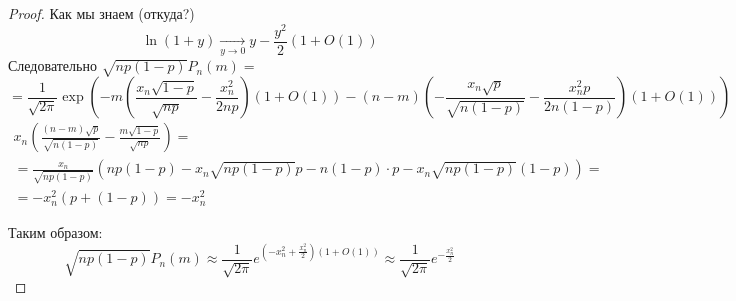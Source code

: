 \documentclass[12pt]{article}
\theoremstyle{definition} %
\theoremstyle{plain} %
\theoremstyle{remark} %
\begin{document}
\begin{proof}
    Как мы знаем (откуда?)
    \[\ln(1 + y) \xrightarrow[y \to 0]{}y - \frac{y^2}{2}(1 + O(1))\]
    Следовательно $\sqrt{np(1 - p)}P_n(m) =$ 
    \[
        = \frac{1}{\sqrt{2\pi}} \exp \left(-m \left( \frac{x_n \sqrt{1 - p}}{\sqrt{np}} - \frac{x_n^2}{2np}\right)(1 + O(1)) - (n - m)\left(- \frac{x_n\sqrt{p}}{\sqrt{n(1 - p)}} - \frac{x_n^2p}{2n(1 - p)}\right)(1 + O(1))\right)
    \]
    \begin{gather*}
        x_n \left( \frac{(n - m)\sqrt{p}}{\sqrt{n(1 - p)}} - \frac{m\sqrt{1 - p}}{\sqrt{np}}\right) = \\
        = \frac{x_n}{\sqrt{np(1 - p)}}\left(np(1 - p) - x_n\sqrt{np(1 - p)} p - n(1 - p)\cdot p - x_n\sqrt{np(1 - p)}(1 - p)\right) = \\
        = -x_n^2 (p + (1 - p)) = -x_n^2
    \end{gather*}

    Таким образом:
    \[\sqrt{np(1 - p)}P_n(m) \approx \frac{1}{\sqrt{2\pi}}e^{\left(-x_n^2 + \frac{x_n^2}{2}\right)(1 + O(1))} \approx \frac{1}{\sqrt{2\pi}}e^{- \frac{x_n^2}{2}}\]
\end{proof}
\end{document}
